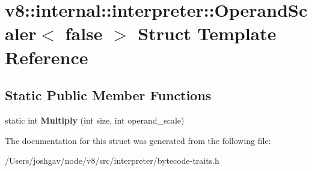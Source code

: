 \hypertarget{structv8_1_1internal_1_1interpreter_1_1_operand_scaler_3_01false_01_4}{}\section{v8\+:\+:internal\+:\+:interpreter\+:\+:Operand\+Scaler$<$ false $>$ Struct Template Reference}
\label{structv8_1_1internal_1_1interpreter_1_1_operand_scaler_3_01false_01_4}
\subsection*{Static Public Member Functions}
\begin{DoxyCompactItemize}
\item 
static int {\bfseries Multiply} (int size, int operand\+\_\+scale)\hypertarget{structv8_1_1internal_1_1interpreter_1_1_operand_scaler_3_01false_01_4_a1d8f6140ac2e7872bdbe2f31e9f56bfc}{}\label{structv8_1_1internal_1_1interpreter_1_1_operand_scaler_3_01false_01_4_a1d8f6140ac2e7872bdbe2f31e9f56bfc}

\end{DoxyCompactItemize}


The documentation for this struct was generated from the following file\+:\begin{DoxyCompactItemize}
\item 
/\+Users/joshgav/node/v8/src/interpreter/bytecode-\/traits.\+h\end{DoxyCompactItemize}

